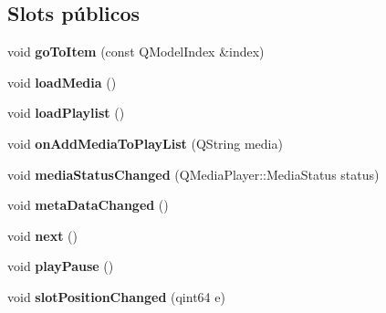 \subsection*{Slots públicos}
\begin{DoxyCompactItemize}
\item 
\hypertarget{class_main_window_a32e621ebdb3ef2d76bd607af16e8d0d0}{void {\bfseries go\-To\-Item} (const Q\-Model\-Index \&index)}\label{class_main_window_a32e621ebdb3ef2d76bd607af16e8d0d0}

\item 
\hypertarget{class_main_window_a5dc0f9a967ac6c534cfbf6e517275ba9}{void {\bfseries load\-Media} ()}\label{class_main_window_a5dc0f9a967ac6c534cfbf6e517275ba9}

\item 
\hypertarget{class_main_window_ac877ae03abf6415808e0bb36ff71e5be}{void {\bfseries load\-Playlist} ()}\label{class_main_window_ac877ae03abf6415808e0bb36ff71e5be}

\item 
\hypertarget{class_main_window_a8bb0a943725aa0d7959a8a93da3194fc}{void {\bfseries on\-Add\-Media\-To\-Play\-List} (Q\-String media)}\label{class_main_window_a8bb0a943725aa0d7959a8a93da3194fc}

\item 
\hypertarget{class_main_window_a2758962312cc237231c349b21603d9fe}{void {\bfseries media\-Status\-Changed} (Q\-Media\-Player\-::\-Media\-Status status)}\label{class_main_window_a2758962312cc237231c349b21603d9fe}

\item 
\hypertarget{class_main_window_aa4ec6868c3ee50f63ffe4803a7136ae6}{void {\bfseries meta\-Data\-Changed} ()}\label{class_main_window_aa4ec6868c3ee50f63ffe4803a7136ae6}

\item 
\hypertarget{class_main_window_aabed273350d064a3a8d73afb01848fea}{void {\bfseries next} ()}\label{class_main_window_aabed273350d064a3a8d73afb01848fea}

\item 
\hypertarget{class_main_window_a6e12ed66de9615bf272f92a47cd5e6c8}{void {\bfseries play\-Pause} ()}\label{class_main_window_a6e12ed66de9615bf272f92a47cd5e6c8}

\item 
\hypertarget{class_main_window_a44f59c80c2093aaaca31cfc82def698f}{void {\bfseries slot\-Position\-Changed} (qint64 e)}\label{class_main_window_a44f59c80c2093aaaca31cfc82def698f}


\end{DoxyCompactItemize}
